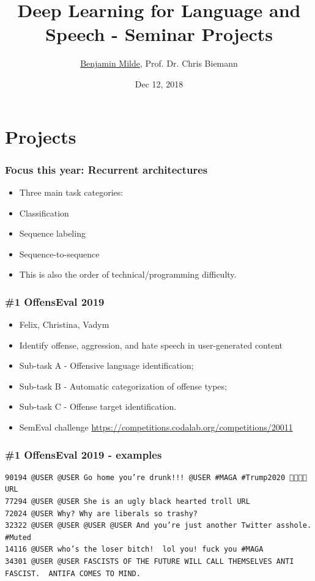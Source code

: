 \documentclass{beamer}
\title{Deep Learning for Language and Speech - Seminar Projects}
\author{\underline{Benjamin Milde}, Prof. Dr. Chris Biemann}
\date[12.12.2018]{Dec 12, 2018}
\begin{document}
\maketitle

\section{Projects}

\begin{frame}
\frametitle{\hspace{-6mm} Focus this year: Recurrent architectures}
\begin{itemize}
    \item Three main task categories:
    \item Classification
	\item Sequence labeling
    \item Sequence-to-sequence
    \item This is also the order of technical/programming difficulty.
 \end{itemize}
\end{frame}

\begin{frame}
\frametitle{\#1 OffensEval 2019}
\begin{itemize}
    \item Felix, Christina, Vadym
    \item Identify offense, aggression, and hate speech in user-generated content
    \item Sub-task A - Offensive language identification;
    \item Sub-task B - Automatic categorization of offense types;
    \item Sub-task C - Offense target identification.
    \item SemEval challenge \url{https://competitions.codalab.org/competitions/20011}
 \end{itemize}
\end{frame}

\begin{frame}[fragile]
\frametitle{\#1 OffensEval 2019 - examples}
\small
  \begin{Verbatim}[fontsize=\footnotesize]
90194 @USER @USER Go home you’re drunk!!! @USER #MAGA #Trump2020 👊🇺🇸👊 URL	
77294 @USER @USER She is an ugly black hearted troll URL	
72024 @USER Why? Why are liberals so trashy?	
32322 @USER @USER @USER @USER And you’re just another Twitter asshole. #Muted
14116 @USER who’s the loser bitch!  lol you! fuck you #MAGA 
34301 @USER @USER FASCISTS OF THE FUTURE WILL CALL THEMSELVES ANTI
FASCIST.  ANTIFA COMES TO MIND.	
  \end{Verbatim}
\end{frame}
\end{document}
